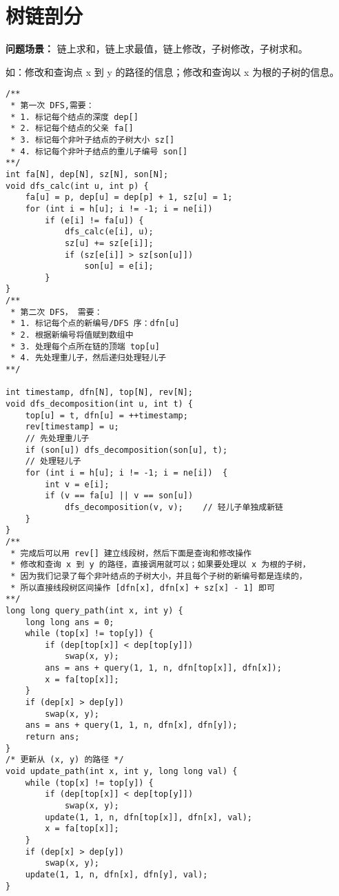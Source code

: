 \section{树链剖分}
\textbf{问题场景：} 链上求和，链上求最值，链上修改，子树修改，子树求和。
~\\
\par \noindent 如：修改和查询点 x 到 y 的路径的信息；修改和查询以 x 为根的子树的信息。
\begin{verbatim}
/**
 * 第一次 DFS,需要：
 * 1. 标记每个结点的深度 dep[]
 * 2. 标记每个结点的父亲 fa[]
 * 3. 标记每个非叶子结点的子树大小 sz[]
 * 4. 标记每个非叶子结点的重儿子编号 son[]
**/
int fa[N], dep[N], sz[N], son[N];
void dfs_calc(int u, int p) {
    fa[u] = p, dep[u] = dep[p] + 1, sz[u] = 1;
    for (int i = h[u]; i != -1; i = ne[i])
        if (e[i] != fa[u]) {
            dfs_calc(e[i], u);
            sz[u] += sz[e[i]];
            if (sz[e[i]] > sz[son[u]])
                son[u] = e[i];
        }
}
/**
 * 第二次 DFS， 需要：
 * 1. 标记每个点的新编号/DFS 序：dfn[u]
 * 2. 根据新编号将值赋到数组中
 * 3. 处理每个点所在链的顶端 top[u]
 * 4. 先处理重儿子，然后递归处理轻儿子
**/

int timestamp, dfn[N], top[N], rev[N];
void dfs_decomposition(int u, int t) {
    top[u] = t, dfn[u] = ++timestamp;
    rev[timestamp] = u;     
    // 先处理重儿子
    if (son[u]) dfs_decomposition(son[u], t);     
    // 处理轻儿子
    for (int i = h[u]; i != -1; i = ne[i])  {
        int v = e[i];
        if (v == fa[u] || v == son[u])
            dfs_decomposition(v, v);    // 轻儿子单独成新链
    }
}
/**
 * 完成后可以用 rev[] 建立线段树，然后下面是查询和修改操作
 * 修改和查询 x 到 y 的路径，直接调用就可以；如果要处理以 x 为根的子树，
 * 因为我们记录了每个非叶结点的子树大小，并且每个子树的新编号都是连续的，
 * 所以直接线段树区间操作 [dfn[x], dfn[x] + sz[x] - 1] 即可
**/
long long query_path(int x, int y) {
    long long ans = 0;
    while (top[x] != top[y]) {
        if (dep[top[x]] < dep[top[y]]) 
            swap(x, y);
        ans = ans + query(1, 1, n, dfn[top[x]], dfn[x]);
        x = fa[top[x]];
    }
    if (dep[x] > dep[y]) 
        swap(x, y);
    ans = ans + query(1, 1, n, dfn[x], dfn[y]);
    return ans;
}
/* 更新从 (x, y) 的路径 */
void update_path(int x, int y, long long val) {
    while (top[x] != top[y]) {
        if (dep[top[x]] < dep[top[y]]) 
            swap(x, y);
        update(1, 1, n, dfn[top[x]], dfn[x], val);
        x = fa[top[x]];
    }
    if (dep[x] > dep[y]) 
        swap(x, y);
    update(1, 1, n, dfn[x], dfn[y], val);
}
\end{verbatim}


